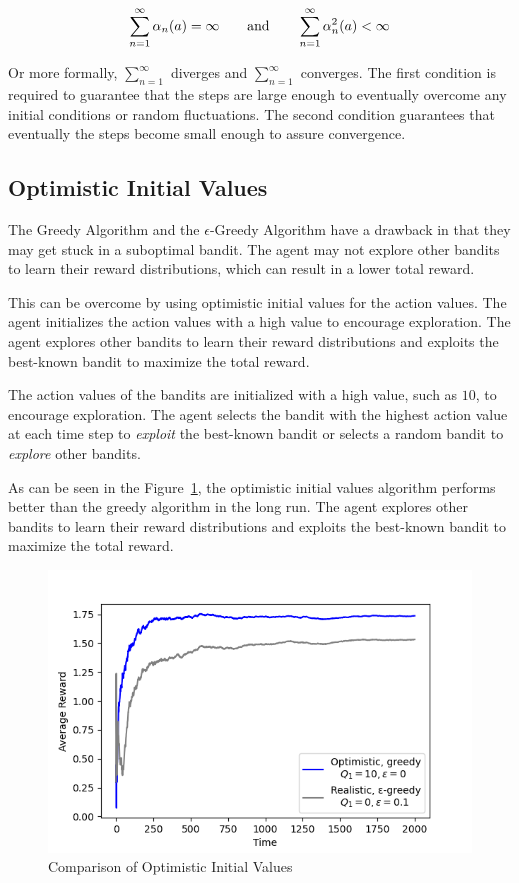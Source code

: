 \begin{equation}
    \sum_{n=1}^{\infty}\alpha_n(a) = \infty \quad\quad \text{and} \quad\quad \sum_{n=1}^{\infty}\alpha_n^2(a) < \infty\\
\end{equation}

Or more formally, $\sum_{n=1}^{\infty}$ diverges and $\sum_{n=1}^{\infty}$ converges. The first condition is required to guarantee that the steps are large enough to eventually overcome any initial conditions or random fluctuations. The second condition guarantees that eventually the steps become small enough to assure convergence.

\subsection{Optimistic Initial Values}

The Greedy Algorithm and the $\epsilon$-Greedy Algorithm have a drawback in that they may get stuck in a suboptimal bandit. The agent may not explore other bandits to learn their reward distributions, which can result in a lower total reward.

This can be overcome by using optimistic initial values for the action values. The agent initializes the action values with a high value to encourage exploration. The agent explores other bandits to learn their reward distributions and exploits the best-known bandit to maximize the total reward.

The action values of the bandits are initialized with a high value, such as $10$, to encourage exploration. The agent selects the bandit with the highest action value at each time step to \textit{exploit} the best-known bandit or selects a random bandit to \textit{explore} other bandits.

As can be seen in the Figure~\ref{fig:optimistic_greedy}, the optimistic initial values algorithm performs better than the greedy algorithm in the long run. The agent explores other bandits to learn their reward distributions and exploits the best-known bandit to maximize the total reward.

\begin{figure}[h!]
    \centering
    \includegraphics[width=0.75\linewidth]{images/optimistic.png}
    \caption{Comparison of Optimistic Initial Values}
    \label{fig:optimistic_greedy}
\end{figure}

